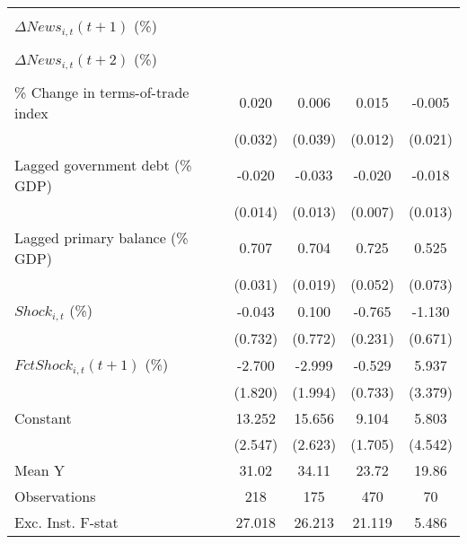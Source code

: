 {\begin{tabular}{l*{4}{c}}
                    &                     &                     &                     &                     \\
\addlinespace
$ \Delta News_{i,t}(t+1)$ (\%)&                     &                     &                     &                     \\
                    &                     &                     &                     &                     \\
\addlinespace
$ \Delta News_{i,t}(t+2)$ (\%)&                     &                     &                     &                     \\
                    &                     &                     &                     &                     \\
\addlinespace
\% Change in terms-of-trade index&       0.020         &       0.006         &       0.015         &      -0.005         \\
                    &     (0.032)         &     (0.039)         &     (0.012)         &     (0.021)         \\
\addlinespace
Lagged government debt (\% GDP)&      -0.020         &      -0.033\sym{**} &      -0.020\sym{**} &      -0.018         \\
                    &     (0.014)         &     (0.013)         &     (0.007)         &     (0.013)         \\
\addlinespace
Lagged primary balance (\% GDP)&       0.707\sym{***}&       0.704\sym{***}&       0.725\sym{***}&       0.525\sym{***}\\
                    &     (0.031)         &     (0.019)         &     (0.052)         &     (0.073)         \\
\addlinespace
$ Shock_{i,t}$ (\%) &      -0.043         &       0.100         &      -0.765\sym{***}&      -1.130         \\
                    &     (0.732)         &     (0.772)         &     (0.231)         &     (0.671)         \\
\addlinespace
$ FctShock_{i,t}(t+1)$ (\%)&      -2.700         &      -2.999         &      -0.529         &       5.937         \\
                    &     (1.820)         &     (1.994)         &     (0.733)         &     (3.379)         \\
\addlinespace
Constant            &      13.252\sym{***}&      15.656\sym{***}&       9.104\sym{***}&       5.803         \\
                    &     (2.547)         &     (2.623)         &     (1.705)         &     (4.542)         \\
\midrule
Mean Y              &       31.02         &       34.11         &       23.72         &       19.86         \\
Observations        &         218         &         175         &         470         &          70         \\
Exc. Inst. F-stat   &      27.018         &      26.213         &      21.119         &       5.486         \\
\bottomrule
\end{tabular}
}
